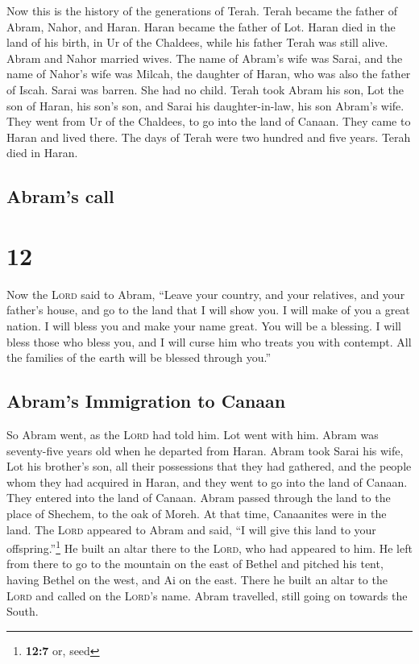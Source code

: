  Now this is the history of the generations of Terah.
Terah became the father of Abram, Nahor, and Haran. Haran became the
father of Lot.  Haran died in the land of his birth, in
Ur of the Chaldees, while his father Terah was still alive.
 Abram and Nahor married wives. The name of Abram's wife
was Sarai, and the name of Nahor's wife was Milcah, the daughter of
Haran, who was also the father of Iscah.  Sarai was
barren. She had no child.  Terah took Abram his son, Lot
the son of Haran, his son's son, and Sarai his daughter-in-law, his son
Abram's wife. They went from Ur of the Chaldees, to go into the land of
Canaan. They came to Haran and lived there.  The days of
Terah were two hundred and five years. Terah died in Haran.

\hypertarget{abrams-call}{%
\subsection{Abram's call}\label{abrams-call}}

\hypertarget{section-11}{%
\section{12}\label{section-11}}

 Now the \textsc{Lord} said to Abram, ``Leave your
country, and your relatives, and your father's house, and go to the land
that I will show you.  I will make of you a great nation.
I will bless you and make your name great. You will be a blessing.
 I will bless those who bless you, and I will curse him
who treats you with contempt. All the families of the earth will be
blessed through you.''

\hypertarget{abrams-immigration-to-canaan}{%
\subsection{Abram's Immigration to
Canaan}\label{abrams-immigration-to-canaan}}

 So Abram went, as the \textsc{Lord} had told him. Lot
went with him. Abram was seventy-five years old when he departed from
Haran.  Abram took Sarai his wife, Lot his brother's son,
all their possessions that they had gathered, and the people whom they
had acquired in Haran, and they went to go into the land of Canaan. They
entered into the land of Canaan.  Abram passed through the
land to the place of Shechem, to the oak of Moreh. At that time,
Canaanites were in the land.  The \textsc{Lord} appeared
to Abram and said, ``I will give this land to your
offspring.''\footnote{\textbf{12:7} or, seed} He built an altar there to
the \textsc{Lord}, who had appeared to him.  He left from
there to go to the mountain on the east of Bethel and pitched his tent,
having Bethel on the west, and Ai on the east. There he built an altar
to the \textsc{Lord} and called on the \textsc{Lord}'s name.
 Abram travelled, still going on towards the South.

